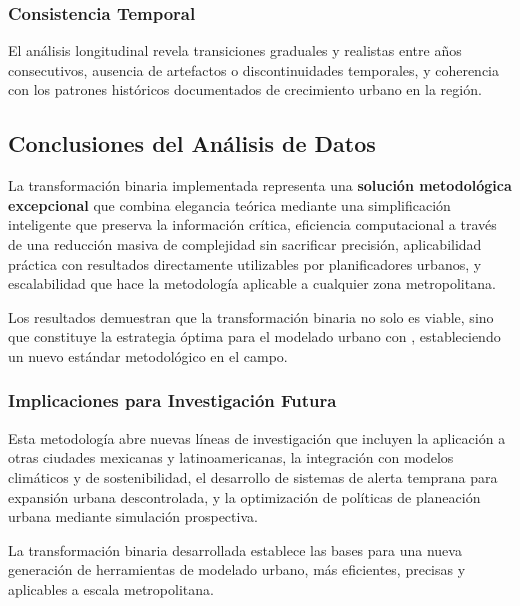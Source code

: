 \subsubsection{Consistencia Temporal}

El análisis longitudinal revela transiciones graduales y realistas entre años consecutivos, ausencia de artefactos o discontinuidades temporales, y coherencia con los patrones históricos documentados de crecimiento urbano en la región.

\subsection{Conclusiones del Análisis de Datos}

La transformación binaria implementada representa una \textbf{solución metodológica excepcional} que combina elegancia teórica mediante una simplificación inteligente que preserva la información crítica, eficiencia computacional a través de una reducción masiva de complejidad sin sacrificar precisión, aplicabilidad práctica con resultados directamente utilizables por planificadores urbanos, y escalabilidad que hace la metodología aplicable a cualquier zona metropolitana.

Los resultados demuestran que la transformación binaria no solo es viable, sino que constituye la estrategia óptima para el modelado urbano con \AC{}, estableciendo un nuevo estándar metodológico en el campo.

\subsubsection{Implicaciones para Investigación Futura}

Esta metodología abre nuevas líneas de investigación que incluyen la aplicación a otras ciudades mexicanas y latinoamericanas, la integración con modelos climáticos y de sostenibilidad, el desarrollo de sistemas de alerta temprana para expansión urbana descontrolada, y la optimización de políticas de planeación urbana mediante simulación prospectiva.

La transformación binaria desarrollada establece las bases para una nueva generación de herramientas de modelado urbano, más eficientes, precisas y aplicables a escala metropolitana.
